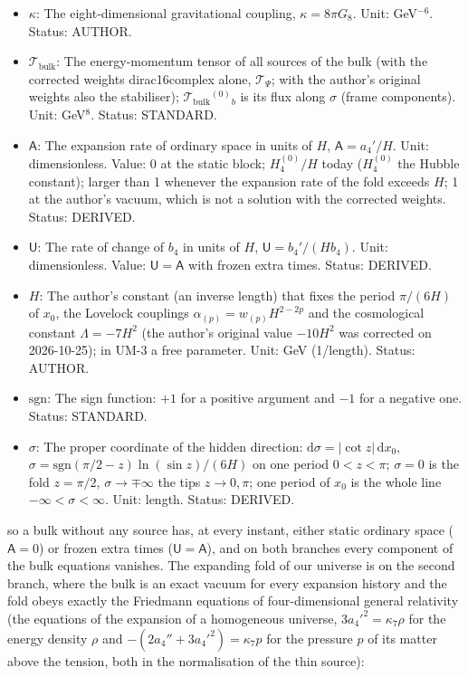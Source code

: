 \documentclass[
  10pt,
]{article}
\providecommand{\tightlist}{%
  \setlength{\itemsep}{0pt}\setlength{\parskip}{0pt}}
\begin{document}
\begin{itemize}
\tightlist
\item
  \(\kappa\): The eight-dimensional gravitational coupling,
  \(\kappa = 8\pi G_8\). Unit: GeV\(^{-6}\). Status: AUTHOR.
\item
  \(\mathcal{T}_{\mathrm{bulk}}\): The energy-momentum tensor of all
  sources of the bulk (with the corrected weights dirac16complex alone,
  \(\mathcal{T}_\Psi\); with the author's original weights also the
  stabiliser); \(\mathcal{T}_{\mathrm{bulk}}{}^{(0)}{}_b\) is its flux
  along \(\sigma\) (frame components). Unit: GeV\(^8\). Status:
  STANDARD.
\item
  \(\mathsf{A}\): The expansion rate of ordinary space in units of
  \(H\), \(\mathsf{A} = a_4'/H\). Unit: dimensionless. Value: 0 at the
  static block; \(H_4^{(0)}/H\) today (\(H_4^{(0)}\) the Hubble
  constant); larger than 1 whenever the expansion rate of the fold
  exceeds \(H\); 1 at the author's vacuum, which is not a solution with
  the corrected weights. Status: DERIVED.
\item
  \(\mathsf{U}\): The rate of change of \(b_4\) in units of \(H\),
  \(\mathsf{U} = b_4'/(Hb_4)\). Unit: dimensionless. Value:
  \(\mathsf{U} = \mathsf{A}\) with frozen extra times. Status: DERIVED.
\item
  \(H\): The author's constant (an inverse length) that fixes the period
  \(\pi/(6H)\) of \(x_0\), the Lovelock couplings
  \(\alpha_{(p)} = w_{(p)}H^{2-2p}\) and the cosmological constant
  \(\Lambda = -7H^2\) (the author's original value \(-10H^2\) was
  corrected on 2026-10-25); in UM-3 a free parameter. Unit: GeV
  (1/length). Status: AUTHOR.
\item
  \(\mathrm{sgn}\): The sign function: \(+1\) for a positive argument
  and \(-1\) for a negative one. Status: STANDARD.
\item
  \(\sigma\): The proper coordinate of the hidden direction:
  \(\mathrm{d}\sigma = \lvert\cot z\rvert\,\mathrm{d}x_0\),
  \(\sigma = \mathrm{sgn}(\pi/2 - z)\ln(\sin z)/(6H)\) on one period
  \(0 < z < \pi\); \(\sigma = 0\) is the fold \(z = \pi/2\),
  \(\sigma \to \mp\infty\) the tips \(z \to 0, \pi\); one period of
  \(x_0\) is the whole line \(-\infty < \sigma < \infty\). Unit: length.
  Status: DERIVED.
\end{itemize}

so a bulk without any source has, at every instant, either static
ordinary space (\(\mathsf{A} = 0\)) or frozen extra times
(\(\mathsf{U} = \mathsf{A}\)), and on both branches every component of
the bulk equations vanishes. The expanding fold of our universe is on
the second branch, where the bulk is an exact vacuum for every expansion
history and the fold obeys exactly the Friedmann equations of
four-dimensional general relativity (the equations of the expansion of a
homogeneous universe, \(3a_4'^2 = \kappa_7\rho\) for the energy density
\(\rho\) and \(-(2a_4'' + 3a_4'^2) = \kappa_7p\) for the pressure \(p\)
of its matter above the tension, both in the normalisation of the thin
source):
\end{document}
